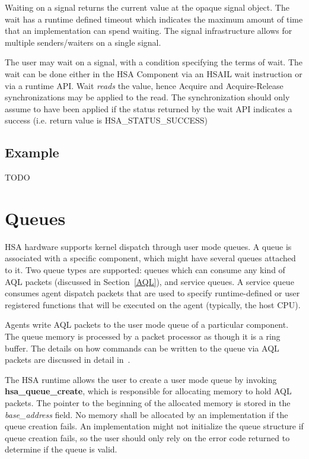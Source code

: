 \documentclass[final]{book}
\newcommand{\reffun}[1]{\textbf{#1}}
\newcommand{\reffld}[1]{\textit{#1}}
\newcommand{\reftyp}[1]{#1}
\newcommand{\refenu}[1]{\reftyp{#1}}
\begin{document}
Waiting on a signal returns the current value at the opaque signal object. The
wait has a runtime defined timeout which indicates the maximum amount of time
that an implementation can spend waiting. The signal infrastructure allows for
multiple senders/waiters on a single signal.

The user may wait on a signal, with a condition specifying the terms of
wait. The wait can be done either in the HSA Component via an HSAIL wait
instruction or via a runtime API. Wait \emph{reads} the value, hence Acquire and
Acquire-Release synchronizations may be applied to the read. The synchronization
should only assume to have been applied if the status returned by the wait API
indicates a success (i.e. return value is \refenu{HSA_STATUS_SUCCESS})

\hypertarget{signal-example}{} \subsection{Example}
TODO

\hypertarget{architected-queue}{} \section{Queues} \label{architected-queue}
HSA hardware supports kernel dispatch through user mode queues. A queue is
associated with a specific component, which might have several queues attached
to it. Two queue types are supported: queues which can consume any kind of AQL
packets (discussed in Section~\ref{AQL}), and service queues. A service queue
consumes agent dispatch packets that are used to specify runtime-defined or user
registered functions that will be executed on the agent (typically, the host
CPU).

Agents write AQL packets to the user mode queue of a particular component. The
queue memory is processed by a packet processor as though it is a ring
buffer. The details on how commands can be written to the queue via AQL packets
are discussed in detail in~\cite{sar}.

The HSA runtime allows the user to create a user mode queue by invoking
\reffun{hsa_queue_create}, which is responsible for allocating memory to hold
AQL packets. The pointer to the beginning of the allocated memory is stored in
the \reffld{base_address} field. No memory shall be allocated by an
implementation if the queue creation fails. An implementation might not
initialize the queue structure if queue creation fails, so the user should only
rely on the error code returned to determine if the queue is valid.
\end{document}
